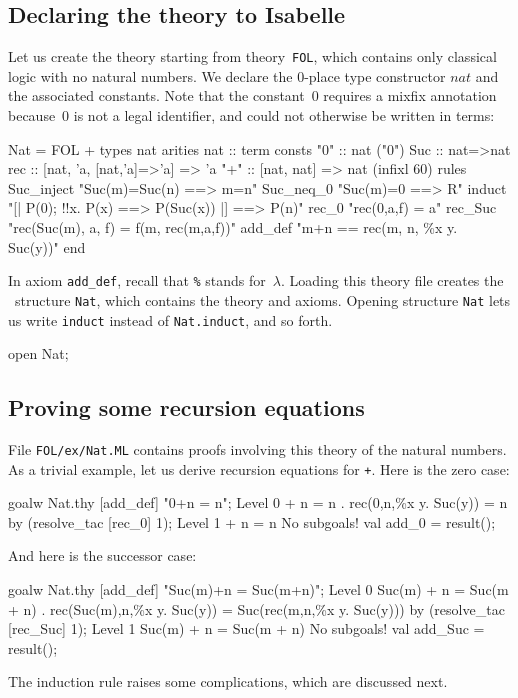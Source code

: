\subsection{Declaring the theory to Isabelle}
Let us create the theory  starting from theory~\verb$FOL$,
which contains only classical logic with no natural numbers.  We declare
the 0-place type constructor $nat$ and the associated constants.  Note that
the constant~0 requires a mixfix annotation because~0 is not a legal
identifier, and could not otherwise be written in terms:
\begin{ttbox}
Nat = FOL +
types   nat
arities nat         :: term
consts  "0"         :: nat                              ("0")
        Suc         :: nat=>nat
        rec         :: [nat, 'a, [nat,'a]=>'a] => 'a
        "+"         :: [nat, nat] => nat                (infixl 60)
rules   Suc_inject  "Suc(m)=Suc(n) ==> m=n"
        Suc_neq_0   "Suc(m)=0      ==> R"
        induct      "[| P(0);  !!x. P(x) ==> P(Suc(x)) |]  ==> P(n)"
        rec_0       "rec(0,a,f) = a"
        rec_Suc     "rec(Suc(m), a, f) = f(m, rec(m,a,f))"
        add_def     "m+n == rec(m, n, \%x y. Suc(y))"
end
\end{ttbox}
In axiom {\tt add_def}, recall that \verb|%| stands for~$\lambda$.
Loading this theory file creates the \ML\ structure {\tt Nat}, which
contains the theory and axioms.  Opening structure {\tt Nat} lets us write
{\tt induct} instead of {\tt Nat.induct}, and so forth.
\begin{ttbox}
open Nat;
\end{ttbox}

\subsection{Proving some recursion equations}
File {\tt FOL/ex/Nat.ML} contains proofs involving this theory of the
natural numbers.  As a trivial example, let us derive recursion equations
for \verb$+$.  Here is the zero case:
\begin{ttbox}
goalw Nat.thy [add_def] "0+n = n";
{\out Level 0}
{ + n = n}
{. rec(0,n,\%x y. Suc(y)) = n}
\ttbreak
by (resolve_tac [rec_0] 1);
{\out Level 1}
{ + n = n}
{\out No subgoals!}
val add_0 = result();
\end{ttbox}
And here is the successor case:
\begin{ttbox}
goalw Nat.thy [add_def] "Suc(m)+n = Suc(m+n)";
{\out Level 0}
{\out Suc(m) + n = Suc(m + n)}
{. rec(Suc(m),n,\%x y. Suc(y)) = Suc(rec(m,n,\%x y. Suc(y)))}
\ttbreak
by (resolve_tac [rec_Suc] 1);
{\out Level 1}
{\out Suc(m) + n = Suc(m + n)}
{\out No subgoals!}
val add_Suc = result();
\end{ttbox}
The induction rule raises some complications, which are discussed next.


